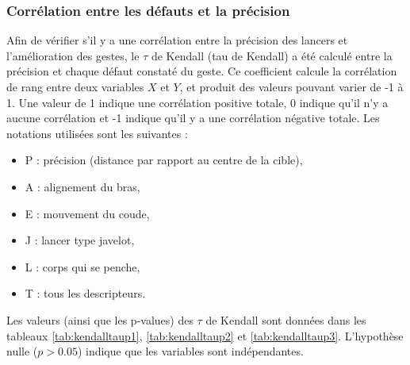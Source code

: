 \subsubsection{Corrélation entre les défauts et la précision}
Afin de vérifier s'il y a une corrélation entre la précision des lancers et l'amélioration des gestes, le $\tau$ de Kendall (tau de Kendall) a été calculé entre la précision et chaque défaut constaté du geste. Ce coefficient calcule la corrélation de rang entre deux variables $X$ et $Y$, et produit des valeurs pouvant varier de -1 à 1. Une valeur de 1 indique une corrélation positive totale, 0 indique qu'il n'y a aucune corrélation et -1 indique qu'il y a une corrélation négative totale. Les notations utilisées sont les suivantes :

\begin{itemize}[label=$-$]
	\item P : précision (distance par rapport au centre de la cible),
	\item A : alignement du bras,
	\item E : mouvement du coude,
	\item J : lancer type javelot,
	\item L : corps qui se penche,
	\item T : tous les descripteurs.
\end{itemize}

Les valeurs (ainsi que les p-values) des $\tau$ de Kendall sont données dans les tableaux \ref{tab:kendalltaup1}, \ref{tab:kendalltaup2} et \ref{tab:kendalltaup3}. L'hypothèse nulle ($p > 0.05$) indique que les variables sont indépendantes.

